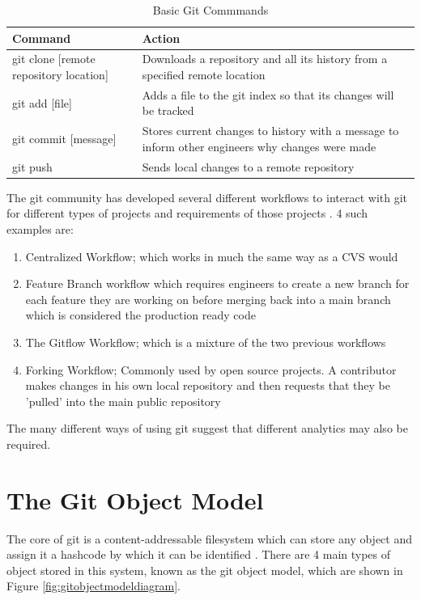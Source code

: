 \documentclass[11pt]{book}
\begin{document}
\begin{table}[h]
\centering
\begin{tabular}{| l | p{9cm} |}
\hline
\textbf{Command} & \textbf{Action} \\ \hline
git clone [remote repository location] & Downloads a repository and all its history from a specified remote location \\ \hline
git add [file] & Adds a file to the git index so that its changes will be tracked \\ \hline
git commit [message] & Stores current changes to history with a message to inform other engineers why changes were made \\ \hline
git push & Sends local changes to a remote repository \\ \hline
\end{tabular}
\caption{Basic Git Commmands}
\label{tab:basic-git-commands}
\end{table}

The git community has developed several different workflows to interact with git for different types of projects and requirements of those projects \cite{gitcomparingworkflows}. 4 such examples are: 

\begin{enumerate}
	\item Centralized Workflow; which works in much the same way as a CVS would
	\item Feature Branch workflow which requires engineers to create a new branch for each feature they are working on before merging back into a main branch which is considered the production ready code
	\item The Gitflow Workflow; which is a mixture of the two previous workflows
	\item Forking Workflow; Commonly used by open source projects. A contributor makes changes in his own local repository and then requests that they be 'pulled' into the main public repository
\end{enumerate}

The many different ways of using git suggest that different analytics may also be required.

\clearpage

\section{The Git Object Model}
\label{gitobjectmodel}
The core of git is a content-addressable filesystem which can store any object and assign it a hashcode by which it can be identified \cite{progit}. There are 4 main types of object stored in this system, known as the git object model, which are shown in Figure \ref{fig:gitobjectmodeldiagram}.
\end{document}
